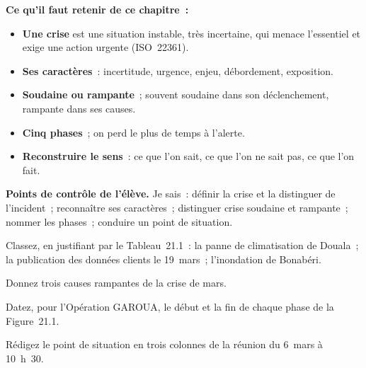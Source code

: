\begin{boxresume}
\textbf{Ce qu'il faut retenir de ce chapitre~:}
\begin{itemize}
    \item \textbf{Une crise} est une situation instable, très incertaine,
          qui menace l'essentiel et exige une action urgente (ISO~22361).
    \item \textbf{Ses caractères}~: incertitude, urgence, enjeu, débordement,
          exposition.
    \item \textbf{Soudaine ou rampante}~; souvent soudaine dans son
          déclenchement, rampante dans ses causes.
    \item \textbf{Cinq phases}~; on perd le plus de temps à l'alerte.
    \item \textbf{Reconstruire le sens}~: ce que l'on sait, ce que l'on ne
          sait pas, ce que l'on fait.
\end{itemize}
\end{boxresume}

\begin{boxinfo}
\textbf{Points de contrôle de l'élève.} Je sais~: définir la crise et la
distinguer de l'incident~; reconnaître ses caractères~; distinguer crise
soudaine et rampante~; nommer les phases~; conduire un point de situation.
\end{boxinfo}

\bigskip

\begin{boxexo}[title={\ding{45}\quad Exercice~21.1. Incident ou crise \niveaubase}]
Classez, en justifiant par le Tableau~21.1~: la panne de climatisation de
Douala~; la publication des données clients le 19~mars~; l'inondation de
Bonabéri.
\end{boxexo}

\begin{boxexo}[title={\ding{45}\quad Exercice~21.2. Rampante \niveaubase}]
Donnez trois causes rampantes de la crise de mars.
\end{boxexo}

\begin{boxexo}[title={\ding{45}\quad Exercice~21.3. Les phases \niveaubase}]
Datez, pour l'Opération GAROUA, le début et la fin de chaque phase de la
Figure~21.1.
\end{boxexo}

\begin{boxexo}[title={\ding{45}\quad Exercice~21.4. Le point de situation \niveaumoyen}]
Rédigez le point de situation en trois colonnes de la réunion du 6~mars à
10~h~30.
\end{boxexo}

